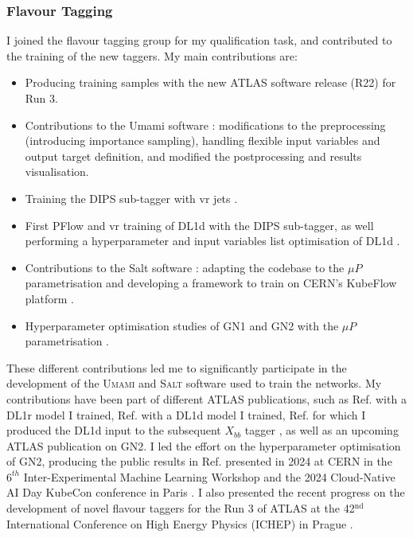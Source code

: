\subsubsection{Flavour Tagging}
I joined the flavour tagging group for my qualification task, and contributed to the training of the new taggers. My main contributions are:
\begin{itemize}
    \item Producing training samples with the new ATLAS software release (R22) for Run 3.
    \item Contributions to the Umami software \cite{UmamiCite}: modifications to the preprocessing (introducing importance sampling), handling flexible input variables and output target definition, and modified the postprocessing and results visualisation.
    \item Training the DIPS sub-tagger with \gls{vr} jets \cite{ATL-PHYS-PUB-2020-014}.
    \item First PFlow and \gls{vr} training of DL1d with the DIPS sub-tagger, as well performing a hyperparameter and input variables list optimisation of DL1d \cite{ATL-PLOT-FTAG-2023-01}.
    \item Contributions to the Salt software \cite{SaltCite}: adapting the codebase to the $\mu P$ parametrisation \cite{pmlr-v139-yang21c} and developing a framework to train on CERN's KubeFlow platform \cite{KubeFlowCern}. 
    \item Hyperparameter optimisation studies of GN1 and GN2 with the $\mu P$ parametrisation \cite{publicplotMUP}.
\end{itemize}
These different contributions led me to significantly participate in the development of the \textsc{Umami} \cite{UmamiCite} and \textsc{Salt} \cite{SaltCite} software used to train the networks. My contributions have been part of different ATLAS publications, such as Ref. \cite{ATL-PHYS-PUB-2022-027} with a DL1r model I trained, Ref. \cite{ATL-PLOT-FTAG-2023-01} with a DL1d model I trained, Ref. \cite{ATL-PHYS-PUB-2023-021} for which I produced the DL1d input to the subsequent $X_{bb}$ tagger \cite{ATL-PHYS-PUB-2020-019}, as well as an upcoming ATLAS publication on GN2. I led the effort on the hyperparameter optimisation of GN2, producing the public results in Ref. \cite{publicplotMUP} presented in 2024 at CERN in the $6^{th}$ Inter-Experimental Machine Learning Workshop \cite{publicplotMUP} and the 2024 Cloud-Native AI Day KubeCon conference in Paris \cite{KubeconTalk}. I also presented the recent progress on the development of novel flavour taggers for the Run 3 of ATLAS at the 42$^{\text{nd}}$ International Conference on High Energy Physics (ICHEP) in Prague \cite{Draguet:2906774}.

